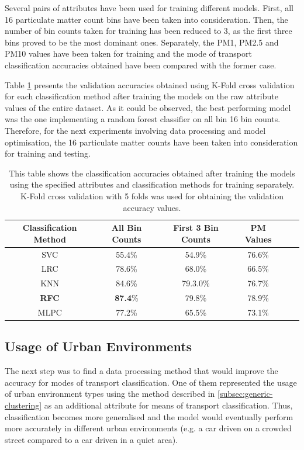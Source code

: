 \documentclass[bsc,frontabs,twoside,singlespacing,parskip,deptreport]{infthesis}     %
\begin{document}
Several pairs of attributes have been used for training different models. First, all 16 particulate matter count bins have been taken into consideration. Then, the number of bin counts taken for training has been reduced to 3, as the first three bins proved to be the most dominant ones. Separately, the PM1, PM2.5 and PM10 values have been taken for training and the mode of transport classification accuracies obtained have been compared with the former case. 

Table \ref{table:abs-values-models} presents the validation accuracies obtained using K-Fold cross validation for each classification method after training the models on the raw attribute values of the entire dataset. As it could be observed, the best performing model was the one implementing a random forest classifier on all bin 16 bin counts. Therefore, for the next experiments involving data processing and model optimisation, the 16 particulate matter counts have been taken into consideration for training and testing.

\begin{table}[h!]
\centering
 \begin{tabular}{||c | c | c | c | c | c||} 
 \hline
 Classification Method & All Bin Counts & First 3 Bin Counts & PM Values \\ [0.5ex] 
 \hline\hline
 SVC & 55.4\% & 54.9\% & 76.6\% \\ 
 \hline
 LRC & 78.6\% & 68.0\% & 66.5\% \\
 \hline
 KNN & 84.6\% & 79.3.0\% & 76.7\% \\ 
 \hline
 \textbf{RFC} & \textbf{87.4}\% & 79.8\% & 78.9\% \\ 
 \hline
  MLPC & 77.2\% & 65.5\% & 73.1\% \\ 
 \hline
\end{tabular}
\caption{This table shows the classification accuracies obtained after training the models using the specified attributes and classification methods for training separately. K-Fold cross validation with 5 folds was used for obtaining the validation accuracy values.}
\label{table:abs-values-models}
\end{table}


\subsection{Usage of Urban Environments}
\label{subsec:results-urban-env-use}

The next step was to find a data processing method that would improve the accuracy for modes of transport classification. One of them represented the usage of urban environment types using the method described in \ref{subsec:generic-clustering} as an additional attribute for means of transport classification. Thus, classification becomes more generalised and the model would eventually perform more accurately in different urban environments (e.g. a car driven on a crowded street compared to a car driven in a quiet area).
\end{document}
